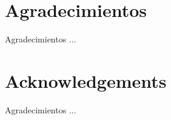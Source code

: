 \chapter{Agradecimientos} %

Agradecimientos ...




\chapter{Acknowledgements} %

Agradecimientos ...

